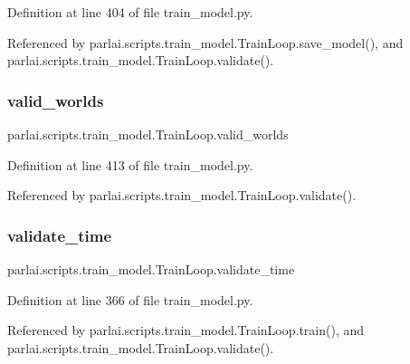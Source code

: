 Definition at line 404 of file train\+\_\+model.\+py.



Referenced by parlai.\+scripts.\+train\+\_\+model.\+Train\+Loop.\+save\+\_\+model(), and parlai.\+scripts.\+train\+\_\+model.\+Train\+Loop.\+validate().

\mbox{\label{classparlai_1_1scripts_1_1train__model_1_1TrainLoop_a45643d393057a2a47e8a6e74acdc7515}} 
\subsubsection{\texorpdfstring{valid\+\_\+worlds}{valid\_worlds}}
{\footnotesize\ttfamily parlai.\+scripts.\+train\+\_\+model.\+Train\+Loop.\+valid\+\_\+worlds}



Definition at line 413 of file train\+\_\+model.\+py.



Referenced by parlai.\+scripts.\+train\+\_\+model.\+Train\+Loop.\+validate().

\mbox{\label{classparlai_1_1scripts_1_1train__model_1_1TrainLoop_ac7752245b67836fbcf9469a6247a14a2}} 
\subsubsection{\texorpdfstring{validate\+\_\+time}{validate\_time}}
{\footnotesize\ttfamily parlai.\+scripts.\+train\+\_\+model.\+Train\+Loop.\+validate\+\_\+time}



Definition at line 366 of file train\+\_\+model.\+py.



Referenced by parlai.\+scripts.\+train\+\_\+model.\+Train\+Loop.\+train(), and parlai.\+scripts.\+train\+\_\+model.\+Train\+Loop.\+validate().

